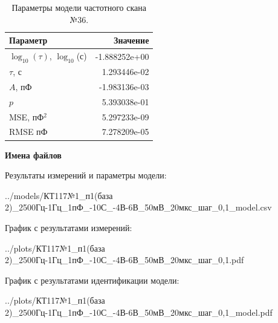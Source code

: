 \begin{table}[!ht]
    \centering
    \caption{Параметры модели частотного скана №36.}
    \begin{tabular}{|l|r|}
        \hline
        Параметр                                       & Значение                  \\ \hline
        $\log_{10}(\tau)$, $\log_{10}$(с)              & -1.888252e+00             \\ \hline
        $\tau$, с                                      & 1.293446e-02              \\ \hline
        $A$, пФ                                        & -1.983136e-03             \\ \hline
        $p$                                            & 5.393038e-01              \\ \hline
        MSE, пФ$^2$                                    & 5.297233e-09              \\ \hline
        RMSE пФ                                        & 7.278209e-05              \\ \hline
    \end{tabular}
    \label{table:frequency_scan_model_36}
\end{table}

\textbf{Имена файлов}

Результаты измерений и параметры модели:

\scriptsize../models/КТ117№1\_п1(база 2)\_2500Гц-1Гц\_1пФ\_-10С\_-4В-6В\_50мВ\_20мкс\_шаг\_0,1\_model.csv
\normalsize

График с результатами измерений:

\scriptsize../plots/КТ117№1\_п1(база 2)\_2500Гц-1Гц\_1пФ\_-10С\_-4В-6В\_50мВ\_20мкс\_шаг\_0,1.pdf
\normalsize

График с результатами идентификации модели:

\scriptsize../plots/КТ117№1\_п1(база 2)\_2500Гц-1Гц\_1пФ\_-10С\_-4В-6В\_50мВ\_20мкс\_шаг\_0,1\_model.pdf
\normalsize

